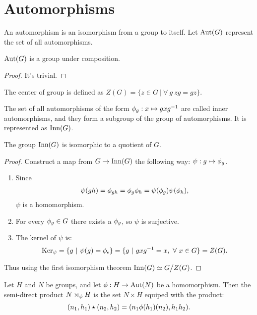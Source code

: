 \section{Automorphisms}
\begin{definition}
  An automorphism is an isomorphism from a group to itself. Let $\text{Aut}(G)$ represent the set of all automorphisms.
\end{definition}
\begin{proposition}
  $\text{Aut}(G)$ is a group under composition. 
\end{proposition}
\begin{proof}
  It's trivial.
\end{proof}
\begin{definition}
  The center of group is defined as $Z(G) = \{z \in G\ |\ \forall\ g\ zg = gz\}$.
\end{definition}
\begin{definition}
  The set of all automorphisms of the form $\phi_g:x\mapsto gxg^{-1}$ are called inner automorphisms, and they form a subgroup of the group of automorphisms. It is represented as $\text{Inn}(G)$.
\end{definition}
\begin{proposition}
  The group $\text{Inn}(G)$ is isomorphic to a quotient of $G$.
\end{proposition}
\begin{proof}
  Construct a map from $G\to \text{Inn}(G)$ the following way: $\psi: g \mapsto \phi_g$.
  \begin{enumerate}
    \item Since
      \begin{align*}
        \psi(gh) = \phi_{gh} = \phi_g\phi_h = \psi(\phi_g)\psi(\phi_h), 
      \end{align*}
      $\psi$ is a homomorphism.
    \item For every $\phi_g\in G$ there exists a $\phi_g$, so $\psi$ is surjective.
    \item The kernel of $\psi$ is:
      \begin{align*}
        \Ker_\psi = \{g\ |\ \psi(g) = \p_\e\} = \{g\ |\ gxg^{-1} = x,\ \forall\ x\in G\} = Z(G).
      \end{align*}
  \end{enumerate}
  Thus using the first isomorphism theorem $\inn(G) \simeq G\bign/Z(G)$.
\end{proof}
\begin{definition}
  Let $H$ and $N$ be groups, and let $\phi:H\to \text{Aut}(N)$ be a homomorphism. Then the semi-direct product $N \rtimes_\phi H$ is the set $N\times H$ equiped with the product:
  \begin{align*}
    (n_1, h_1)\star (n_2, h_2) = (n_1 \phi(h_1)(n_2), h_1h_2).
  \end{align*}
\end{definition}
